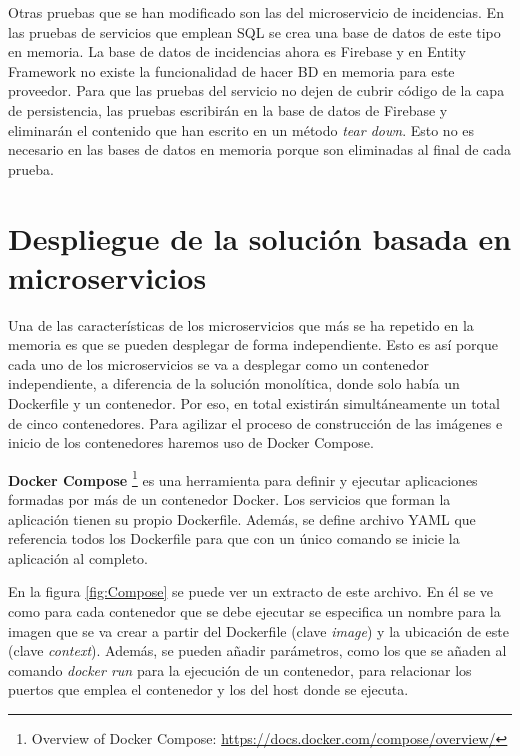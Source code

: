 \documentclass[11pt,spanish,listoffigures]{tfgetsinf}
\begin{document}
Otras pruebas que se han modificado son las del microservicio de incidencias. En las pruebas de servicios que emplean SQL se crea una base de datos de este tipo en memoria. La base de datos de incidencias ahora es Firebase y en Entity Framework no existe la funcionalidad de hacer BD en memoria para este proveedor. Para que las pruebas del servicio no dejen de cubrir código de la capa de persistencia, las pruebas escribirán en la base de datos de Firebase y eliminarán el contenido que han escrito en un método \textit{tear down}. Esto no es necesario en las bases de datos en memoria porque son eliminadas al final de cada prueba.

\section{Despliegue de la solución basada en microservicios} \label{sect:DespliegueMicroservicios}

Una de las características de los microservicios que más se ha repetido en la memoria es que se pueden desplegar de forma independiente. Esto es así porque cada uno de los microservicios se va a desplegar como un contenedor independiente, a diferencia de la solución monolítica, donde solo había un Dockerfile y un contenedor. Por eso, en total existirán simultáneamente un total de cinco contenedores. Para agilizar el proceso de construcción de las imágenes e inicio de los contenedores haremos uso de Docker Compose. 

\textbf{Docker Compose} \footnote{ Overview of Docker Compose: \url{https://docs.docker.com/compose/overview/}}  es una herramienta para definir y ejecutar aplicaciones formadas por más de un contenedor Docker. Los servicios que forman la aplicación tienen su propio Dockerfile. Además, se define archivo YAML que referencia todos los Dockerfile para que con un único comando se inicie la aplicación al completo.

En la figura \ref{fig:Compose} se puede ver un extracto de este archivo. En él se ve como para cada contenedor que se debe ejecutar se especifica un nombre para la imagen que se va crear a partir del Dockerfile (clave \textit{image}) y la ubicación de este (clave \textit{context}). Además, se pueden añadir parámetros, como los que se añaden al comando \textit{docker run} para la ejecución de un contenedor, para relacionar los puertos que emplea el contenedor y los del host donde se ejecuta.
\end{document}
